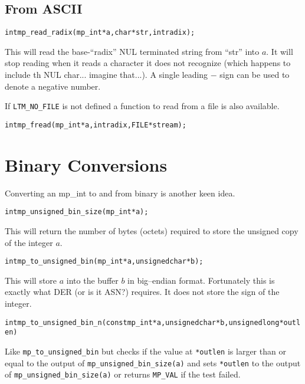 \documentclass[synpaper]{book}
\begin{document}
\subsection{From ASCII}
\begin{alltt}
int mp_read_radix (mp_int * a, char *str, int radix);
\end{alltt}
This will read the base-``radix'' NUL terminated string from ``str'' into $a$.  It will stop reading when it reads a
character it does not recognize (which happens to include th NUL char... imagine that...).  A single leading $-$ sign
can be used to denote a negative number.

If \texttt{LTM\_NO\_FILE} is not defined a function to read from a file is also available.
\begin{alltt}
int mp_fread(mp_int *a, int radix, FILE *stream);
\end{alltt}


\section{Binary Conversions}

Converting an mp\_int to and from binary is another keen idea.

\begin{alltt}
int mp_unsigned_bin_size(mp_int *a);
\end{alltt}

This will return the number of bytes (octets) required to store the unsigned copy of the integer $a$.

\begin{alltt}
int mp_to_unsigned_bin(mp_int *a, unsigned char *b);
\end{alltt}
This will store $a$ into the buffer $b$ in big--endian format.  Fortunately this is exactly what DER (or is it ASN?)
requires.  It does not store the sign of the integer.

\begin{alltt}
int mp_to_unsigned_bin_n(const mp_int *a, unsigned char *b, unsigned long *outlen)
\end{alltt}
Like \texttt{mp\_to\_unsigned\_bin} but checks if the value at \texttt{*outlen} is larger than or equal to the output of \texttt{mp\_unsigned\_bin\_size(a)} and sets \texttt{*outlen} to the output of \texttt{mp\_unsigned\_bin\_size(a)} or returns \texttt{MP\_VAL} if the test failed.
\end{document}
